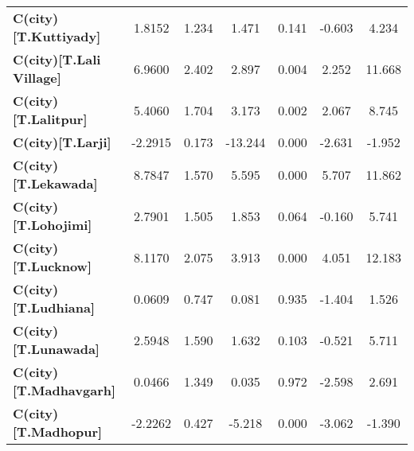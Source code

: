 \begin{center}
\begin{tabular}{lcccccc}
\textbf{C(city)[T.Kuttiyady]}                                                                       &       1.8152  &        1.234     &     1.471  &         0.141        &       -0.603    &        4.234     \\
\textbf{C(city)[T.Lali Village]}                                                                    &       6.9600  &        2.402     &     2.897  &         0.004        &        2.252    &       11.668     \\
\textbf{C(city)[T.Lalitpur]}                                                                        &       5.4060  &        1.704     &     3.173  &         0.002        &        2.067    &        8.745     \\
\textbf{C(city)[T.Larji]}                                                                           &      -2.2915  &        0.173     &   -13.244  &         0.000        &       -2.631    &       -1.952     \\
\textbf{C(city)[T.Lekawada]}                                                                        &       8.7847  &        1.570     &     5.595  &         0.000        &        5.707    &       11.862     \\
\textbf{C(city)[T.Lohojimi]}                                                                        &       2.7901  &        1.505     &     1.853  &         0.064        &       -0.160    &        5.741     \\
\textbf{C(city)[T.Lucknow]}                                                                         &       8.1170  &        2.075     &     3.913  &         0.000        &        4.051    &       12.183     \\
\textbf{C(city)[T.Ludhiana]}                                                                        &       0.0609  &        0.747     &     0.081  &         0.935        &       -1.404    &        1.526     \\
\textbf{C(city)[T.Lunawada]}                                                                        &       2.5948  &        1.590     &     1.632  &         0.103        &       -0.521    &        5.711     \\
\textbf{C(city)[T.Madhavgarh]}                                                                      &       0.0466  &        1.349     &     0.035  &         0.972        &       -2.598    &        2.691     \\
\textbf{C(city)[T.Madhopur]}                                                                        &      -2.2262  &        0.427     &    -5.218  &         0.000        &       -3.062    &       -1.390     \\

\end{tabular}
\end{center}
